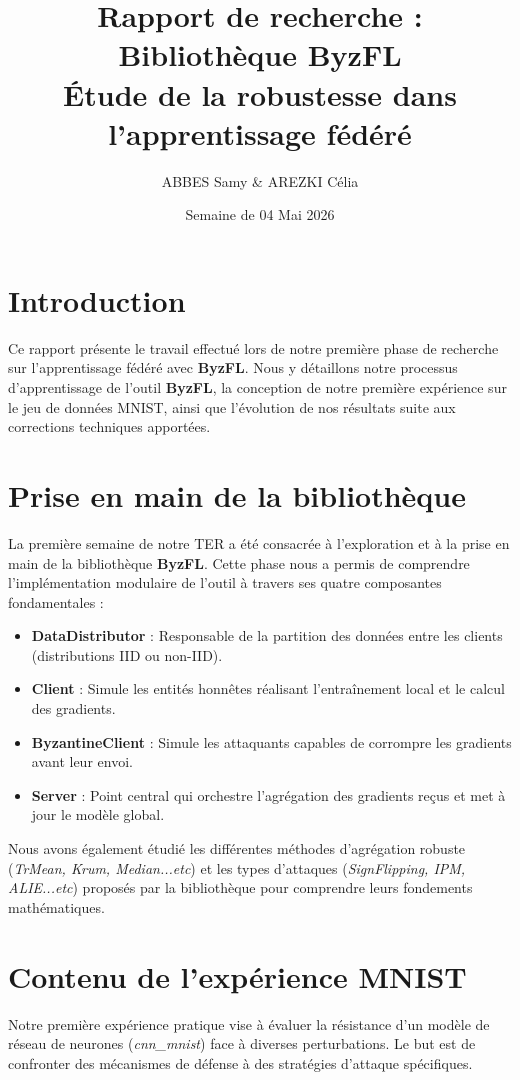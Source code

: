 \documentclass[11pt, a4paper]{article}
\title{\textbf{Rapport de recherche : Bibliothèque ByzFL} \\ \large Étude de la robustesse dans l'apprentissage fédéré}
\author{ABBES Samy \& AREZKI Célia}
\date{Semaine de 04 Mai 2026}
\begin{document}
\maketitle

\section{Introduction}
Ce rapport présente le travail effectué lors de notre première phase de recherche sur l'apprentissage fédéré avec \textbf{ByzFL}. Nous y détaillons notre processus d'apprentissage de l'outil \textbf{ByzFL}, la conception de notre première expérience sur le jeu de données MNIST, ainsi que l'évolution de nos résultats suite aux corrections techniques apportées.

\section{Prise en main de la bibliothèque}
La première semaine de notre TER a été consacrée à l'exploration et à la prise en main de la bibliothèque \textbf{ByzFL}. Cette phase nous a permis de comprendre l'implémentation modulaire de l'outil à travers ses quatre composantes fondamentales :

\begin{itemize}
    \item \textbf{DataDistributor} : Responsable de la partition des données entre les clients (distributions IID ou non-IID).
    \item \textbf{Client} : Simule les entités honnêtes réalisant l'entraînement local et le calcul des gradients.
    \item \textbf{ByzantineClient} : Simule les attaquants capables de corrompre les gradients avant leur envoi.
    \item \textbf{Server} : Point central qui orchestre l'agrégation des gradients reçus et met à jour le modèle global.
\end{itemize}

Nous avons également étudié les différentes méthodes d'agrégation robuste (\textit{TrMean, Krum, Median...etc}) et les types d'attaques (\textit{SignFlipping, IPM, ALIE...etc}) proposés par la bibliothèque pour comprendre leurs fondements mathématiques.

\section{Contenu de l'expérience MNIST}
Notre première expérience pratique vise à évaluer la résistance d'un modèle de réseau de neurones (\textit{cnn\_mnist}) face à diverses perturbations. Le but est de confronter des mécanismes de défense à des stratégies d'attaque spécifiques.
\end{document}
